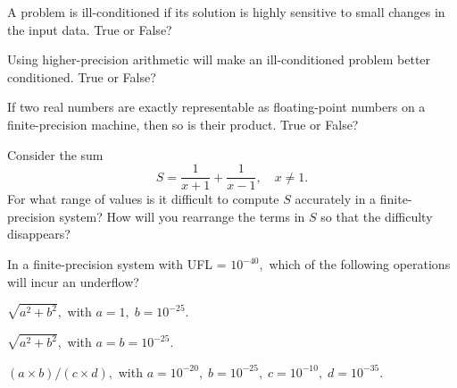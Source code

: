 \item
\benum
\item A problem is ill-conditioned if its solution is highly sensitive to small changes in the input data.  True or False?
\item Using higher-precision arithmetic will make an ill-conditioned problem better conditioned.  True or False?
\item  If two real numbers are exactly representable as floating-point numbers on a finite-precision machine, then so is their product.  True or False?
\item  Consider the sum
\[
S = \frac{1}{x+1} + \frac{1}{x-1}, \quad x \ne 1.
\]
For what range of values is it difficult to compute $S$ accurately in a finite-precision system?  How will you rearrange the terms in $S$ so that the difficulty disappears?
\item In a finite-precision system with UFL = $10^{-40},$ which of the following operations will incur an underflow?
\benum
\item $\sqrt{a^2+b^2},$ with $a=1, \; b=10^{-25}.$
\item $\sqrt{a^2+b^2},$ with $a=b=10^{-25}.$
\item $(a\times b)/(c \times d),$ with $a=10^{-20}, \; b=10^{-25}, \; c=10^{-10}, \; d=10^{-35}.$
\eenum

\eenum

\eenum

